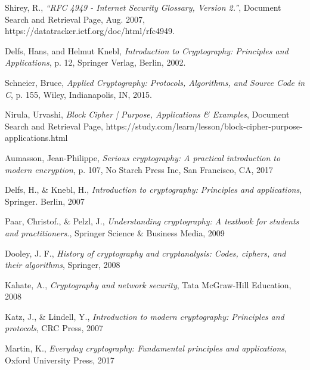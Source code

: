 \begin{thebibliography}{9}

  Shirey, R.,
  \emph{“RFC 4949 - Internet Security Glossary, Version 2.”},
  Document Search and Retrieval Page,
  Aug. 2007,
  https://datatracker.ietf.org/doc/html/rfc4949. 

  Delfs, Hans, and Helmut Knebl,
  \emph{Introduction to Cryptography: Principles and Applications},
  p. 12, Springer Verlag, Berlin,
  2002.
  
  Schneier, Bruce,
  \emph{Applied Cryptography: Protocols, Algorithms, and Source Code in C},
  p. 155, Wiley, Indianapolis, IN,
  2015.

  Nirula, Urvashi,
  \emph{Block Cipher | Purpose, Applications \& Examples},
  Document Search and Retrieval Page,
  https://study.com/learn/lesson/block-cipher-purpose-applications.html
  
  Aumasson, Jean-Philippe,
  \emph{Serious cryptography: A practical introduction to modern encryption},
  p. 107, No Starch Press Inc, San Francisco, CA, 
  2017
  
  Delfs, H., \& Knebl, H.,
  \emph{Introduction to cryptography: Principles and applications},
  Springer. Berlin,
  2007
  
  Paar, Christof., \& Pelzl, J.,
 \emph{Understanding cryptography: A textbook for students and practitioners.},
  Springer Science \& Business Media,
  2009
  
  Dooley, J. F.,
  \emph{History of cryptography and cryptanalysis: Codes, ciphers, and their algorithms},
   Springer,
   2008
    
  Kahate, A.,
  \emph{Cryptography and network security},
  Tata McGraw-Hill Education,
  2008
  
  Katz, J., \& Lindell, Y.,
  \emph{Introduction to modern cryptography: Principles and protocols},
  CRC Press,
  2007
  
  Martin, K.,
  \emph{Everyday cryptography: Fundamental principles and applications},
  Oxford University Press,
  2017


 
  
%  
%
\end{thebibliography}